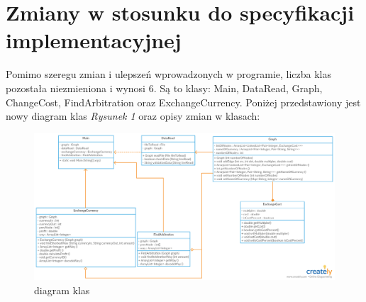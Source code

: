 \documentclass[12pt]{article}
\begin{document}
\section{Zmiany w stosunku do specyfikacji implementacyjnej}
Pomimo szeregu zmian i ulepszeń wprowadzonych w programie, liczba klas pozostała niezmieniona i wynosi 6. Są to klasy: Main, DataRead, Graph, ChangeCost, FindArbitration oraz ExchangeCurrency. Poniżej przedstawiony jest nowy diagram klas \emph{Rysunek 1}  oraz opisy zmian w klasach:

\begin{figure}[h!]
\centerline{\includegraphics[scale=0.37]{diagram}}
\caption{diagram klas}
\label{fig:diagram2}
\end{figure}
\end{document}
